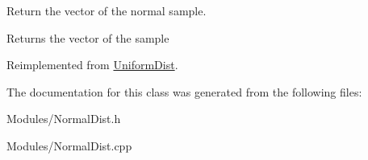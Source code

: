 Return the vector of the normal sample. 

\begin{DoxyReturn}{Returns}
the vector of the sample 
\end{DoxyReturn}


Reimplemented from \hyperlink{classUniformDist_a60df487bfb003628e9997ebcb5aedcde}{Uniform\+Dist}.



The documentation for this class was generated from the following files\+:\begin{DoxyCompactItemize}
\item 
Modules/Normal\+Dist.\+h\item 
Modules/Normal\+Dist.\+cpp\end{DoxyCompactItemize}

